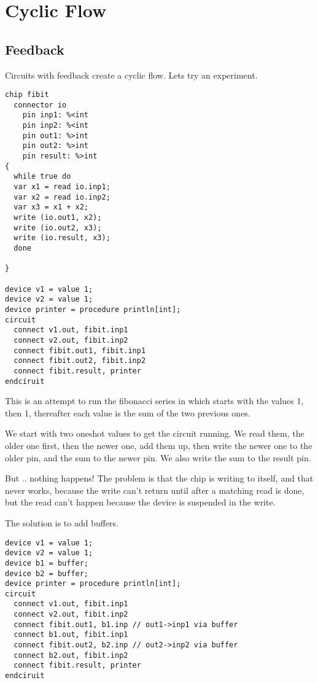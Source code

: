 \documentclass[oneside]{book}
\begin{document}
\chapter{Cyclic Flow}
\section{Feedback}
Circuits with feedback create a cyclic flow. Lets try an experiment.

\begin{verbatim}
chip fibit 
  connector io
    pin inp1: %<int
    pin inp2: %<int
    pin out1: %>int
    pin out2: %>int
    pin result: %>int
{
  while true do
  var x1 = read io.inp1;
  var x2 = read io.inp2;
  var x3 = x1 + x2;
  write (io.out1, x2);
  write (io.out2, x3);
  write (io.result, x3);
  done

}

device v1 = value 1;
device v2 = value 1;
device printer = procedure println[int];
circuit
  connect v1.out, fibit.inp1
  connect v2.out, fibit.inp2
  connect fibit.out1, fibit.inp1
  connect fibit.out2, fibit.inp2
  connect fibit.result, printer
endciruit
\end{verbatim}

This is an attempt to run the fibonacci series in which starts with
the values 1, then 1, thereafter each value is the sum of the two
previous ones.

We start with two oneshot values to get the circuit running.
We read them, the older one first, then the newer one,
add them up, then write the newer one to the older pin,
and the sum to the newer pin. We also write the sum to the result pin.

But .. nothing happens! The problem is that the chip is writing
to itself, and that never works, because the write can't return
until after a matching read is done, but the read can't happen
because the device is suspended in the write.

The solution is to add buffers.

\begin{verbatim}
device v1 = value 1;
device v2 = value 1;
device b1 = buffer;
device b2 = buffer;
device printer = procedure println[int];
circuit
  connect v1.out, fibit.inp1
  connect v2.out, fibit.inp2
  connect fibit.out1, b1.inp // out1->inp1 via buffer
  connect b1.out, fibit.inp1
  connect fibit.out2, b2.inp // out2->inp2 via buffer
  connect b2.out, fibit.inp2
  connect fibit.result, printer
endciruit
\end{verbatim}
\end{document}
